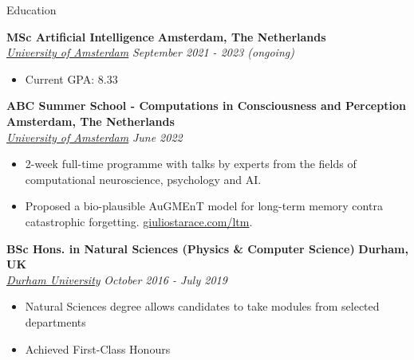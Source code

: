 \documentclass{resume} %
\begin{document}
\begin{rSection}{Education}

	{\bf MSc Artificial Intelligence} \hfill \textbf{Amsterdam, The Netherlands}
	\\\href{https://www.dur.ac.uk/}{\textit{University of Amsterdam}} \hfill {\em September 2021
		- 2023 (ongoing)}
	\begin{itemize}
		\item Current GPA: 8.33
	\end{itemize}

	{\bf ABC Summer School - Computations in Consciousness and Perception} \hfill \textbf{Amsterdam, The Netherlands}
	\\\href{https://www.dur.ac.uk/}{\textit{University of Amsterdam}} \hfill {\em June 2022}
	\begin{itemize}
		\item 2-week full-time programme with talks by experts from the fields of computational
		      neuroscience, psychology and AI.
		\item Proposed a bio-plausible AuGMEnT model for long-term memory
		      contra catastrophic forgetting. \href{https://www.giuliostarace.com/ltm/}{giuliostarace.com/ltm}.
	\end{itemize}

	{\bf BSc Hons. in Natural Sciences (Physics \& Computer Science)} \hfill \textbf{Durham, UK}
	\\\href{https://www.dur.ac.uk/}{\textit{Durham University}} \hfill {\em October 2016 - July 2019}
	\begin{itemize}\vspace{-0.5em}
		\item Natural Sciences degree allows candidates to take modules from selected departments
		\item Achieved First-Class Honours
	\end{itemize}
\end{rSection}
\end{document}
